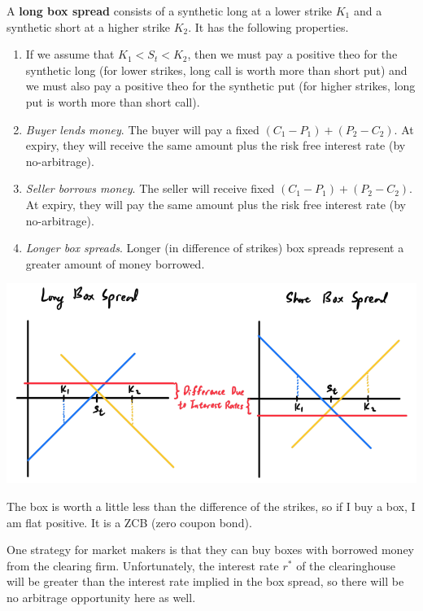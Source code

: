 \documentclass{article}
\begin{document}
    \begin{definition}
      A \textbf{long box spread} consists of a synthetic long at a lower strike $K_1$ and a synthetic short at a higher strike $K_2$. It has the following properties. 
      \begin{enumerate}
        \item If we assume that $K_1 < S_t < K_2$, then we must pay a positive theo for the synthetic long (for lower strikes, long call is worth more than short put) and we must also pay a positive theo for the synthetic put (for higher strikes, long put is worth more than short call). 
        \item \textit{Buyer lends money}. The buyer will pay a fixed $(C_1 - P_1) + (P_2 - C_2)$. At expiry, they will receive the same amount plus the risk free interest rate (by no-arbitrage). 
        \item \textit{Seller borrows money}. The seller will receive fixed $(C_1 - P_1) + (P_2 - C_2)$. At expiry, they will pay the same amount plus the risk free interest rate (by no-arbitrage). 
        \item \textit{Longer box spreads}. Longer (in difference of strikes) box spreads represent a greater amount of money borrowed. 
      \end{enumerate}
      \begin{center}
        \includegraphics[scale=0.3]{img/box_spread.png}
      \end{center}
      The box is worth a little less than the difference of the strikes, so if I buy a box, I am flat positive. It is a ZCB (zero coupon bond).
    \end{definition}

    One strategy for market makers is that they can buy boxes with borrowed money from the clearing firm. Unfortunately, the interest rate $r^\ast$ of the clearinghouse will be greater than the interest rate implied in the box spread, so there will be no arbitrage opportunity here as well. 
\end{document}
